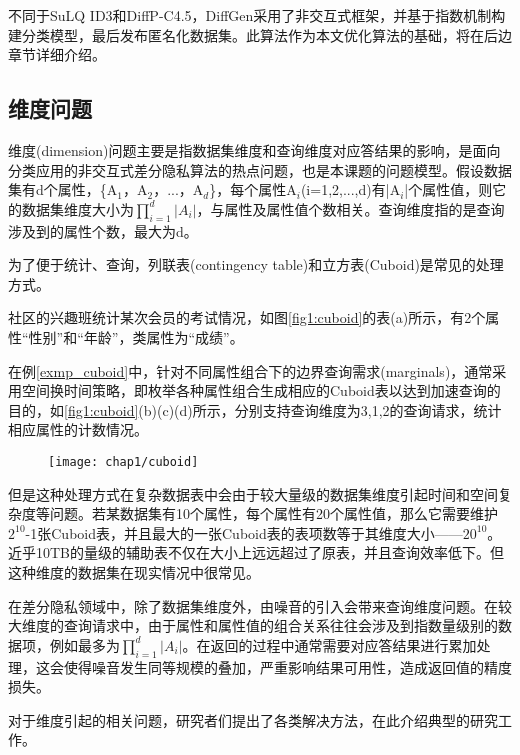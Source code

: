 不同于SuLQ ID3和DiffP-C4.5，DiffGen\supercite{DiffGen}采用了非交互式框架，并基于指数机制构建分类模型，最后发布匿名化数据集。此算法作为本文优化算法的基础，将在后边章节详细介绍。

\subsection{维度问题}
\label{sec:weidu}
维度(dimension)问题主要是指数据集维度和查询维度对应答结果的影响，是面向分类应用的非交互式差分隐私算法的热点问题，也是本课题的问题模型。假设数据集有d个属性，\{A$_{1}$，A$_{2}$，...，A$_{d}$\}，每个属性A$_{i}$(i=1,2,...,d)有|A$_{i}$|个属性值，则它的数据集维度大小为\(\prod\limits_{i = 1}^d {|A{_i} |}\)，与属性及属性值个数相关。查询维度指的是查询涉及到的属性个数，最大为d。

为了便于统计、查询，列联表(contingency table)和立方表(Cuboid)是常见的处理方式。
\begin{exmp}
	\label{exmp_cuboid}
	社区的兴趣班统计某次会员的考试情况，如图\ref{fig1:cuboid}的表(a)所示，有2个属性“性别”和“年龄”，类属性为“成绩”。
\end{exmp}
在例\ref{exmp_cuboid}中，针对不同属性组合下的边界查询需求(marginals\supercite{marginals})，通常采用空间换时间策略，即枚举各种属性组合生成相应的Cuboid表以达到加速查询的目的，如\ref{fig1:cuboid}(b)(c)(d)所示，分别支持查询维度为3,1,2的查询请求，统计相应属性的计数情况。

\begin{figure}[!htp]
	\centering
	\texttt{[image: chap1/cuboid]}
\end{figure}

但是这种处理方式在复杂数据表中会由于较大量级的数据集维度引起时间和空间复杂度等问题。若某数据集有10个属性，每个属性有20个属性值，那么它需要维护$2^{10}$-1张Cuboid表，并且最大的一张Cuboid表的表项数等于其维度大小——$20^{10}$。近乎10TB的量级的辅助表不仅在大小上远远超过了原表，并且查询效率低下。但这种维度的数据集在现实情况中很常见。

在差分隐私领域中，除了数据集维度外，由噪音的引入会带来查询维度问题。在较大维度的查询请求中，由于属性和属性值的组合关系往往会涉及到指数量级别的数据项，例如最多为\(\prod\limits_{i = 1}^d {|A{_i} |}\)。在返回的过程中通常需要对应答结果进行累加处理，这会使得噪音发生同等规模的叠加，严重影响结果可用性，造成返回值的精度损失。

对于维度引起的相关问题，研究者们提出了各类解决方法，在此介绍典型的研究工作。

